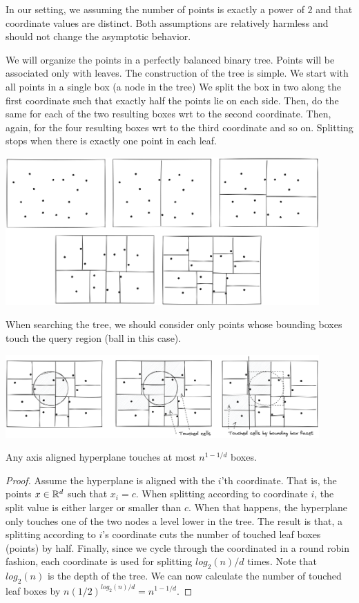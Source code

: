\documentclass{article}
\begin{document}
In our setting, we assuming the number of points is exactly a power of $2$ and that coordinate values are distinct. 
Both assumptions are relatively harmless and should not change the asymptotic behavior. 

We will organize the points in a perfectly balanced binary tree. Points will be associated only with leaves. 
The construction of the tree is simple. We start with all points in a single box (a node in the tree) 
We split the box in two along the first coordinate such that exactly half the points lie on each side.
Then, do the same for each of the two resulting boxes wrt to the second coordinate.
Then, again, for the four resulting boxes wrt to the third coordinate and so on.
Splitting stops when there is exactly one point in each leaf.


\begin{center}
\includegraphics[width=0.9\textwidth]{images/kdtrees-construction.png}
\end{center}


When searching the tree, we should consider only points whose bounding boxes touch the query region (ball in this case).

\begin{center}
\includegraphics[width=0.9\textwidth]{images/kdtrees-search.png}
\end{center}

\begin{fact}
Any axis aligned hyperplane touches at most $n^{1-1/d}$ boxes.
\end{fact}
\begin{proof}
Assume the hyperplane is aligned with the $i$'th coordinate. That is, the points $x\in{\mathbb{R}}^d$ such that $x_i = c$. 
When splitting according to coordinate $i$, the split value is either larger or smaller than $c$. 
When that happens, the hyperplane only touches one of the two nodes a level lower in the tree.
The result is that, a splitting according to $i$'s coordinate cuts the number of touched leaf boxes (points) by half.
Finally, since we cycle through the coordinated in a round robin fashion, each coordinate is used for splitting $log_2(n)/d$ times.
Note that $log_2(n)$ is the depth of the tree. We can now calculate the number of touched leaf boxes by $n (1/2)^{log_2(n)/d} = n^{1-1/d}$.
\end{proof}
\end{document}
